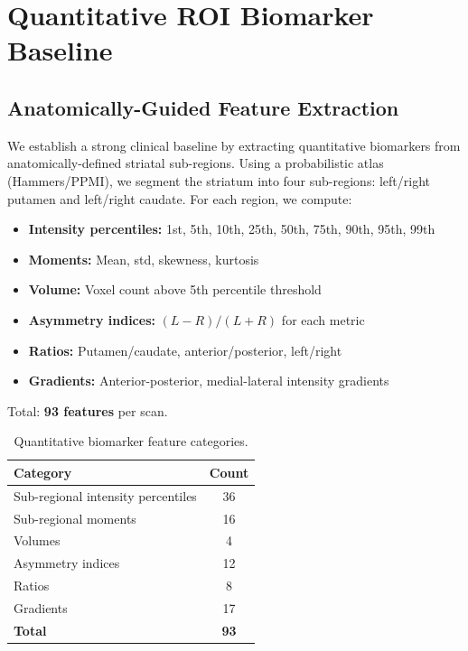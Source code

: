 \section{Quantitative ROI Biomarker Baseline}
\label{sec:biomarkers}

\subsection{Anatomically-Guided Feature Extraction}
\label{sec:feature_extraction}

We establish a strong clinical baseline by extracting quantitative biomarkers from anatomically-defined striatal sub-regions. Using a probabilistic atlas (Hammers/PPMI), we segment the striatum into four sub-regions: left/right putamen and left/right caudate. For each region, we compute:

\begin{itemize}
    \item \textbf{Intensity percentiles:} 1st, 5th, 10th, 25th, 50th, 75th, 90th, 95th, 99th
    \item \textbf{Moments:} Mean, std, skewness, kurtosis
    \item \textbf{Volume:} Voxel count above 5th percentile threshold
    \item \textbf{Asymmetry indices:} $(L - R) / (L + R)$ for each metric
    \item \textbf{Ratios:} Putamen/caudate, anterior/posterior, left/right
    \item \textbf{Gradients:} Anterior-posterior, medial-lateral intensity gradients
\end{itemize}

Total: \textbf{93 features} per scan.

\begin{table}[H]
\centering
\caption{Quantitative biomarker feature categories.}
\label{tab:biomarker_features}
\begin{tabular}{lc}
\toprule
\textbf{Category} & \textbf{Count} \\
\midrule
Sub-regional intensity percentiles & 36 \\
Sub-regional moments & 16 \\
Volumes & 4 \\
Asymmetry indices & 12 \\
Ratios & 8 \\
Gradients & 17 \\
\textbf{Total} & \textbf{93} \\
\bottomrule
\end{tabular}
\end{table}

